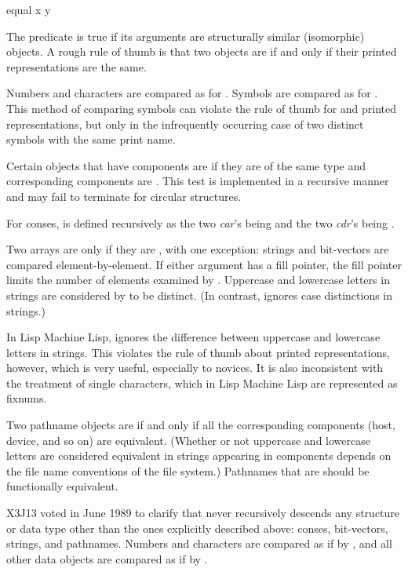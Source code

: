 \begin{defun}[Function]
equal x y

The  predicate is true if its arguments are structurally similar
(isomorphic) objects.  A rough rule of thumb is that two objects
are  if and only if their printed representations are the same.

Numbers and characters are compared as for .
Symbols are compared as for .  This method
of comparing symbols can violate the rule
of thumb for  and printed representations,
but only in the infrequently occurring case of two distinct
symbols with the same print name.

Certain objects that have components are  if they are of the same
type and corresponding components are .
This test is implemented in a recursive manner and may fail to
terminate for circular structures.

For conses,  is defined recursively as
the two \emph{car}'s being  and the two \emph{cdr}'s being
.

Two arrays are  only if they are ,
with one exception:
strings and bit-vectors are compared element-by-element.
If either argument has a fill pointer, the fill pointer limits
the number of elements examined by .
Uppercase and lowercase letters in strings are considered by
 to be distinct.  (In contrast,  ignores
case distinctions in strings.)

\beforenoterule
\begin{incompatibility}
In Lisp Machine Lisp,  ignores the difference between
uppercase and lowercase letters in strings.
This violates the rule of thumb about
printed representations, however, which is very useful, especially
to novices.  It is also inconsistent with the treatment of single characters,
which in Lisp Machine Lisp are represented as fixnums.
\end{incompatibility}
\afternoterule

Two pathname objects are  if and only if
all the corresponding components
(host, device, and so on) are equivalent.  (Whether or not
uppercase and lowercase letters are considered equivalent
in strings appearing in components depends on the file
name conventions of the file system.)  Pathnames
that are  should be functionally equivalent.

\begin{new}
X3J13 voted in June 1989
to clarify that  never recursively
descends any structure or data type other than the ones explicitly
described above: conses, bit-vectors, strings, and pathnames.
Numbers and characters are compared as if by , and all other
data objects are compared as if by .
\end{new}


\end{defun}
